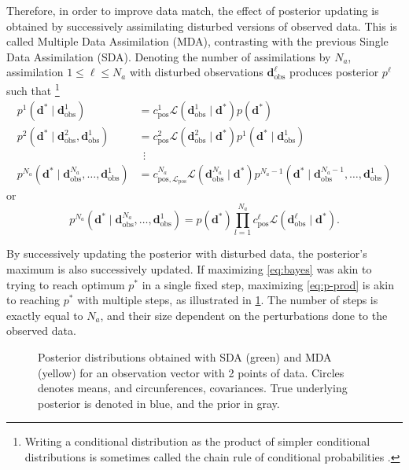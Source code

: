 Therefore, in order to improve data match, the effect of posterior updating is obtained 
by successively assimilating disturbed versions of observed data.
%
This is called Multiple Data Assimilation (MDA), contrasting with the previous Single Data Assimilation (SDA).
%
Denoting the number of assimilations by $N_a$,
assimilation $1\leq \ell \leq N_a$ with disturbed observations $\mathbf{d}^\ell_\text{obs}$
produces posterior $p^\ell$ such that%
\footnote{%
    Writing a conditional distribution as the product of simpler conditional distributions 
    is sometimes called  the chain rule of conditional probabilities
    \cite[subsection C.1.8]{Emerick:2025}.
}
%
\begin{align}
    p^1(\mathbf{d}^*\mid \mathbf{d}^1_\text{obs}) 
    &= c^1_\text{pos} \mathcal{L}(\mathbf{d}^1_\text{obs}\mid \mathbf{d}^*) 
                        p(\mathbf{d}^*) 
\label{eq:p1}
    \\
    p^2(\mathbf{d}^*\mid \mathbf{d}^2_\text{obs}, \mathbf{d}^1_\text{obs}) 
    &= c^2_\text{pos} \mathcal{L}(\mathbf{d}^2_\text{obs}\mid \mathbf{d}^*) 
                        p^1(\mathbf{d}^*\mid \mathbf{d}^1_\text{obs}) 
\label{eq:p2} 
    \\
    &\ \ \vdots 
    \\
    p^{N_a}(\mathbf{d}^*\mid \mathbf{d}^{N_a}_\text{obs}, \dots, \mathbf{d}^1_\text{obs})
    &= c^{N_a}_{\text{pos},\mathcal{L}_\text{pos}} \mathcal{L}(\mathbf{d}^{N_a}_\text{obs} \mid \mathbf{d}^*)
        p^{N_a-1}(\mathbf{d}^*\mid \mathbf{d}^{N_a-1}_\text{obs}, \dots, \mathbf{d}^1_\text{obs}) 
\label{eq:pNa} 
\end{align}  
%
or
%
\begin{equation}
    p^{N_a}(\mathbf{d}^*\mid \mathbf{d}^{N_a}_\text{obs}, \dots, \mathbf{d}^1_\text{obs})
    =
    p(\mathbf{d}^*) \prod_{l=1}^{N_a} c^\ell_\text{pos} \mathcal{L}(\mathbf{d}^\ell_\text{obs} \mid \mathbf{d}^*). 
\label{eq:p-prod}
\end{equation}  

By successively updating the posterior with disturbed data, the posterior's maximum is also successively updated.
If maximizing \cref{eq:bayes} was akin to trying to reach optimum $p^*$ in a single fixed step,
maximizing \cref{eq:p-prod} is akin to reaching $p^*$ with multiple steps, 
as illustrated in \cref{fig:sda-versus-mda}.
The number of steps is exactly equal to $N_a$, and their size dependent on the perturbations done to the observed data. 
%
\begin{figure}[htbp]
    \centering 
    \caption{%
        Posterior distributions obtained with SDA (green) and MDA (yellow) 
        for an observation vector with 2 points of data.
        Circles denotes means, and circunferences, covariances.
        True underlying posterior is denoted in blue, and the prior in gray. 
    }
    \label{fig:sda-versus-mda}
    
\end{figure}

